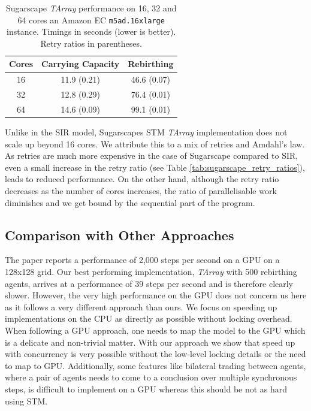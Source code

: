 \begin{table}
	\centering	
 
  	\begin{tabular}{ c || c | c }
        Cores  & Carrying Capacity  & Rebirthing    \\ \hline \hline 
    	    16     & 11.9 (0.21)        & 46.6 (0.07)   \\ \hline
   		32     & 12.8 (0.29)        & 76.4 (0.01)   \\ \hline
   		64     & 14.6 (0.09)        & 99.1 (0.01)   \\ \hline \hline
   	\end{tabular}

  	\caption[Sugarscape \textit{TArray} performance on 16, 32 and 64 cores an Amazon EC \texttt{m5ad.16xlarge} instance]{Sugarscape \textit{TArray} performance on 16, 32 and 64 cores an Amazon EC \texttt{m5ad.16xlarge} instance. Timings in seconds (lower is better). Retry ratios in parentheses.}
	\label{tab:sug_varying_cores_amazon}
\end{table}

Unlike in the SIR model, Sugarscapes STM \textit{TArray} implementation does not scale up beyond 16 cores. We attribute this to a mix of retries and Amdahl's law. As retries are much more expensive in the case of Sugarscape compared to SIR, even a small increase in the retry ratio (see Table \ref{tab:sugarscape_retry_ratios}), leads to reduced performance. On the other hand, although the retry ratio decreases as the number of cores increases, the ratio of parallelisable work diminishes and we get bound by the sequential part of the program.

\subsection{Comparison with Other Approaches}
The paper \cite{lysenko_framework_2008} reports a performance of 2,000 steps per second on a GPU on a 128x128 grid. Our best performing implementation, \textit{TArray} with 500 rebirthing agents, arrives at a performance of 39 steps per second and is therefore clearly slower. However, the very high performance on the GPU does not concern us here as it follows a very different approach than ours. We focus on speeding up implementations on the CPU as directly as possible without locking overhead. When following a GPU approach, one needs to map the model to the GPU which is a delicate and non-trivial matter. With our approach we show that speed up with concurrency is very possible without the low-level locking details or the need to map to GPU. Additionally, some features like bilateral trading between agents, where a pair of agents needs to come to a conclusion over multiple synchronous steps, is difficult to implement on a GPU whereas this should be not as hard using STM.


